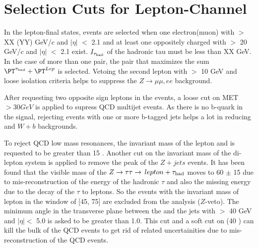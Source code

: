 \section{\texorpdfstring{Selection Cuts for Lepton-\Tau Channel}{Selection Cuts for Lepton-Tau Channel}}
\label{sect:eleTauCuts}

In the lepton-\Tau final states, events are selected when one electron(muon) with \PT $>$ XX (YY) GeV/$c$ and $|\eta|$ $<$ 2.1 and at least 
one oppositely charged \Tau with \PT $>$ 20 GeV/$c$ and $|\eta|$ $<$ 2.1 exist. $I_{\tau_{\rm had}}$ of the hadronic tau must be less than XX GeV.
In the case of more than one pair, the pair that maximizes the sum $\PT^{\Tau} + \PT^{Lep}$ is selected.
Vetoing the second lepton with \PT $>$ 10 GeV and loose isolation criteria helps to suppress the $Z\rightarrow \mu\mu, ee$ background.

After requesting two opposite sign leptons in the events, a loose cut on MET $>30 GeV$ is applied to supress QCD multijet events. 
As there is no b-quark in the signal, rejecting events with one or more b-tagged jets helps a lot in reducing \ttbar and $W+b$ backgrounds.

To reject QCD low mass resonances, the invariant mass of the lepton and \Tau is requested to be greater than 15 \GeV. 
Another cut on the invariant mass of the di-lepton system is applied to remove the peak of the $Z+jets$ events. 
It has been found that the visible mass of the $Z\to\tau\tau\to\,lepton +\tau_{\rm had}$ moves to 60 $\pm$ 15 \GeV due to 
mis-reconstruction of the energy of the hadronic $\tau$ and also the missing energy due to the decay of the $\tau$ to leptons. 
So the events with the invariant mass of lepton \Tau in the window of [45, 75] are excluded from the analysis ($Z$-veto). 
The minimum angle in the transverse plane between the \MET and the jets with \PT $>$ 40 GeV and $|\eta| <$ 5.0 
is asked to be greater than 1.0. This cut and a soft cut on \mttwo (40 \GeV) can kill the bulk of the QCD events 
to get rid of related uncertainities due to mis-reconstruction of the QCD events. 


